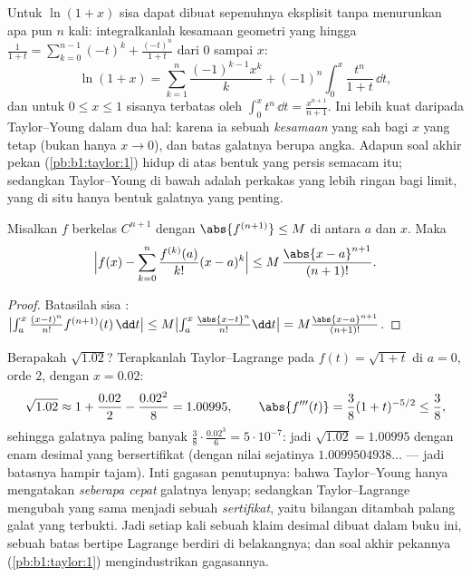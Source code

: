 \begin{example}\label{ex:b1:taylor:lnexact}
Untuk $\ln(1 + x)$ sisa  dapat dibuat sepenuhnya
eksplisit tanpa menurunkan apa pun $n$ kali: integralkanlah
kesamaan geometri yang hingga $\frac{1}{1+t} =
\sum_{k=0}^{n-1}(-t)^k + \frac{(-t)^n}{1+t}$ dari $0$ sampai $x$:
\[
\ln(1 + x) = \sum_{k=1}^{n} \frac{(-1)^{k-1}x^k}{k}
+ (-1)^n \int_0^x \frac{t^n}{1 + t}\,\dd t ,
\]
dan untuk $0 \leq x \leq 1$ sisanya terbatas oleh $\int_0^x
t^n\,\dd t = \frac{x^{n+1}}{n+1}$. Ini lebih kuat daripada
Taylor--Young dalam dua hal: karena ia sebuah \emph{kesamaan} yang sah bagi
$x$ yang tetap (bukan hanya $x \to 0$), dan batas galatnya berupa angka.
Adapun soal akhir pekan (\cref{pb:b1:taylor:1}) hidup di atas bentuk yang
persis semacam itu; sedangkan Taylor--Young di bawah adalah perkakas yang lebih ringan bagi limit, yang di situ
hanya bentuk galatnya yang penting.
\end{example}

\begin{theorem}\label{thm:b1:taylor:lagrange}
Misalkan $f$ berkelas $C^{n+1}$ dengan $\abs{f^{(n+1)}} \leq M$ di antara $a$ dan
$x$. Maka
\[
\Bigl| f(x) - \sum_{k=0}^{n} \frac{f^{(k)}(a)}{k!}(x-a)^k \Bigr|
\leq M\, \frac{\abs{x - a}^{n+1}}{(n+1)!} .
\]
\end{theorem}

\begin{proof}
Batasilah sisa : $\bigl|\int_a^x \frac{(x-t)^n}{n!}
f^{(n+1)}(t)\,\dd t\bigr| \leq M \bigl|\int_a^x
\frac{\abs{x-t}^n}{n!}\dd t\bigr| = M\frac{\abs{x-a}^{n+1}}{(n+1)!}$.
\end{proof}

\begin{example}\label{ex:b1:taylor:certified}
Berapakah $\sqrt{1.02}$? Terapkanlah Taylor--Lagrange pada $f(t) =
\sqrt{1 + t}$ di $a = 0$, orde $2$, dengan $x = 0.02$:
\[
\sqrt{1.02} \approx 1 + \frac{0.02}{2} - \frac{0.02^2}{8}
= 1.00995 ,
\qquad
\abs{f'''(t)} = \frac{3}{8}(1+t)^{-5/2} \leq \frac 38 ,
\]
sehingga galatnya paling banyak $\frac38 \cdot \frac{0.02^3}{6} =
5\cdot10^{-7}$: jadi $\sqrt{1.02} = 1.00995$ dengan enam desimal yang
bersertifikat (dengan nilai sejatinya $1.0099504938\dots$ --- jadi batasnya hampir
tajam). Inti gagasan penutupnya: bahwa Taylor--Young hanya mengatakan \emph{seberapa
cepat} galatnya lenyap; sedangkan Taylor--Lagrange mengubah
 yang sama menjadi sebuah \emph{sertifikat}, yaitu bilangan ditambah palang
galat yang terbukti. Jadi setiap kali sebuah klaim desimal dibuat dalam buku ini, sebuah
batas bertipe Lagrange berdiri di belakangnya; dan soal akhir pekannya
(\cref{pb:b1:taylor:1}) mengindustrikan gagasannya.
\end{example}

